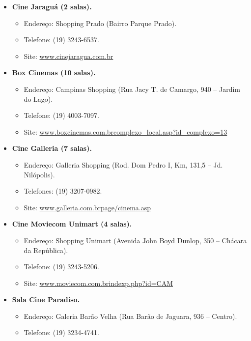 \begin{itemize}
\item  \textbf{Cine Jaraguá (2 salas).}
\begin{itemize}
\item  Endereço: Shopping Prado (Bairro Parque Prado).
\item  Telefone: (19) 3243-6537.
\item  Site: \url{www.cinejaragua.com.br}
\end{itemize}
\end{itemize}

\begin{itemize}
\item  \textbf{Box Cinemas (10 salas).}
\begin{itemize}
\item  Endereço: Campinas Shopping (Rua Jacy T. de Camargo, 940 -- Jardim do Lago).
\item  Telefone: (19) 4003-7097.
\item  Site: \url{www.boxcinemas.com.brcomplexo_local.asp?id_complexo=13}
\end{itemize}
\end{itemize}

\begin{itemize}
\item  \textbf{Cine Galleria (7 salas).}
\begin{itemize}
\item  Endereço: Galleria Shopping (Rod. Dom Pedro I, Km, 131,5 -- Jd. Nilópolis).
\item  Telefones: (19) 3207-0982.
\item  Site: \url{www.galleria.com.brpage/cinema.asp}
\end{itemize}
\end{itemize}

\begin{itemize}
\item  \textbf{Cine Moviecom Unimart (4 salas).}
\begin{itemize}
\item  Endereço: Shopping Unimart (Avenida John Boyd Dunlop, 350 -- Chácara da República).
\item  Telefone: (19) 3243-5206.
\item  Site: \url{www.moviecom.com.brindexp.php?id=CAM}
\end{itemize}
\end{itemize}

\begin{itemize}
\item  \textbf{Sala Cine Paradiso.}
\begin{itemize}
\item  Endereço: Galeria Barão Velha (Rua Barão de Jaguara, 936 -- Centro).
\item  Telefone: (19) 3234-4741.
\end{itemize}
\end{itemize}

